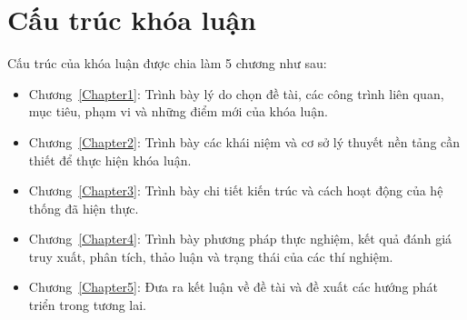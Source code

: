 
\section{Cấu trúc khóa luận}

Cấu trúc của khóa luận được chia làm 5 chương như sau:

\begin{itemize}
    \item Chương~\ref{Chapter1}: \textbf{}
\newline
Trình bày lý do chọn đề tài, các công trình liên quan, mục tiêu, phạm vi và những điểm mới của khóa luận.
    \item Chương~\ref{Chapter2}: \textbf{}
\newline
Trình bày các khái niệm và cơ sở lý thuyết nền tảng cần thiết để thực hiện khóa luận.
    \item Chương~\ref{Chapter3}: \textbf{}
\newline
Trình bày chi tiết kiến trúc và cách hoạt động của hệ thống đã hiện thực.
    \item Chương~\ref{Chapter4}: \textbf{}
\newline
Trình bày phương pháp thực nghiệm, kết quả đánh giá truy xuất, phân tích, thảo luận và trạng thái của các thí nghiệm.
    \item Chương~\ref{Chapter5}: \textbf{}
\newline
Đưa ra kết luận về đề tài và đề xuất các hướng phát triển trong tương lai.
\end{itemize}
